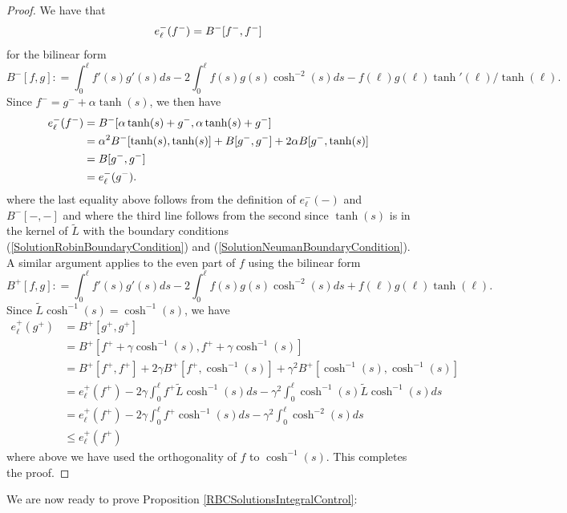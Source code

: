 \documentclass{amsart}
\newcommand{\wt}{\widetilde}
\begin{document}
\begin{proof}
We have that
\begin{align} \notag
e^{-}_\ell(f^-) = B^- [f^-, f^-]
\end{align}
for the bilinear form 
\[
B^-[f, g] : = \int_{0}^\ell f' (s)g' (s) ds - 2 \int_{0}^\ell f(s) g (s) \cosh^{-2}(s) ds -  f(\ell) g(\ell)  \tanh'(\ell)/\tanh (\ell).
\]
Since $f^{-} = g^- + \alpha \tanh(s)$, we then have
\begin{align} \notag
e^{-}_\ell(f^-)  &  = B^{-}[ \alpha \tanh(s) + g^{-},  \alpha \tanh(s) + g^{-} ]\\ \notag
& = \alpha^2 B^{-}[ \tanh(s),    \tanh(s) ]  + B[ g^{-},   g^{-} ]  + 2 \alpha B[ g^{-},   \tanh(s) ]  \\ \notag
& =  B[g^{-},  g^{-}  ] \\ \notag
& = e^{-}_\ell (g^-).
\end{align}
where the last equality above follows from the definition of $e^{-}_{\ell}(-)$ and $B^-[ -, - ]$ and where the third line follows from the second since $\tanh(s)$ is in the kernel of $\tilde{L}$ with the boundary conditions  (\ref{SolutionRobinBoundaryCondition}) and (\ref{SolutionNeumanBoundaryCondition}). A similar argument applies to the even part of $f$ using the bilinear form
\[
B^+[f, g] : = \int_{0}^\ell f' (s)g' (s) ds - 2 \int_{0}^\ell f(s) g (s) \cosh^{-2}(s) ds +  f(\ell) g(\ell)  \tanh(\ell).
\]
Since $\wt{L} \cosh^{-1}(s) = \cosh^{-1}(s)$, we have
\begin{align*}
e_\ell^+(g^+) & = B^+[g^+, g^+] \\
& =  B^+[f^+ + \gamma \cosh^{-1}(s), f^+  + \gamma \cosh^{-1}(s)] \\
& =  B^+[f^+ , f^+] + 2 \gamma  B^+[f^+,  \cosh^{-1}(s)]  +  \gamma^2B^+[\cosh^{-1}(s), \cosh^{-1}(s)] \\
& = e_{\ell}^+(f^+)  - 2 \gamma \int_0^\ell f^+ \wt{L} \cosh^{-1}(s) ds - \gamma^2  \int_0^\ell \cosh^{-1}(s) \wt{L} \cosh^{-1}(s) ds \\
&=  e_{\ell}^+(f^+)  - 2 \gamma \int_0^\ell f^+ \cosh^{-1}(s) ds - \gamma^2  \int_0^\ell \cosh^{-2}(s) ds\\
& \leq e_{\ell}^+(f^+) 
\end{align*}
where above we have used the orthogonality of $f$ to $\cosh^{-1}(s)$. This completes the proof. 
\end{proof}

We are now ready to prove Proposition \ref{RBCSolutionsIntegralControl}:
\end{document}
